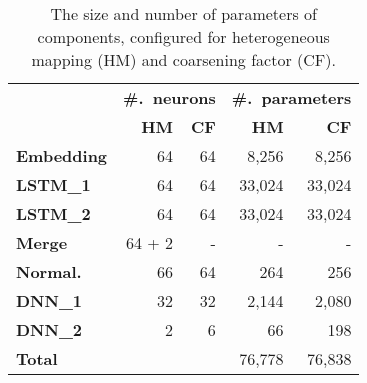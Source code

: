 \begin{table}
	\centering
	\scriptsize
	\begin{tabular}{l r r | r r}
		\toprule
		& \multicolumn{2}{c}{\textbf{\#.\ neurons}}	&	\multicolumn{2}{c}{\textbf{\#.\ parameters}} \\
		\rowcolor{white}
		& \textbf{HM}	& \textbf{CF}	& \textbf{HM} & \textbf{CF} \\
		\midrule
		\textbf{Embedding} &	64 & 64	&	8,256 & 8,256 \\
		\textbf{LSTM\_1} &	64	& 64 & 33,024 & 33,024 \\
		\textbf{LSTM\_2}	& 64 & 64 &	33,024 & 33,024 \\
		\textbf{Merge}	& 64 + 2	& - &	-	& - \\
		\textbf{Normal.} &	66 &	64 &	264 &	256 \\
		\textbf{DNN\_1}	& 32 & 32	&	2,144	& 2,080 \\
		\textbf{DNN\_2}	& 2	& 6 &	66 &	198 \\
		\midrule
		\textbf{Total}	& & & 76,778	& 76,838 \\
		\bottomrule
	\end{tabular}
	\caption{The size and number of parameters of \DeepTune components, configured for heterogeneous mapping (HM) and coarsening factor (CF).}
	\label{tab:nn-size}
\end{table}
